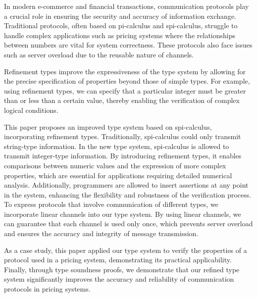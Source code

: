 \documentclass[master,english]{kuisthesis}
\date{June 12th, 2024}
\theoremstyle{definition}
\begin{document}
\maketitle					%

\begin{eabstract}				%

  In modern e-commerce and financial transactions, communication protocols play a crucial role in ensuring the security and accuracy of information exchange. Traditional protocols, often based on pi-calculus and spi-calculus, struggle to handle complex applications such as pricing systems where the relationships between numbers are vital for system correctness. These protocols also face issues such as server overload due to the reusable nature of channels.




Refinement types improve the expressiveness of the type system by allowing for the precise specification of properties beyond those of simple types. For example, using refinement types, we can specify that a particular integer must be greater than or less than a certain value, thereby enabling the verification of complex logical conditions. 

This paper proposes an improved type system based on spi-calculus, incorporating refinement types. Traditionally, spi-calculus could only transmit string-type information. In the new type system, spi-calculus is allowed to transmit integer-type information. By introducing refinement types, it enables comparisons between numeric values and the expression of more complex properties, which are essential for applications requiring detailed numerical analysis. Additionally, programmers are allowed to insert assertions at any point in the system, enhancing the flexibility and robustness of the verification process. To express protocols that involve communication of different types, we incorporate linear channels into our type system. By using linear channels, we can guarantee that each channel is used only once, which prevents server overload and ensures the accuracy and integrity of message transmission. 

As a case study, this paper applied our type system to verify the properties of a protocol used in a pricing system, demonstrating its practical applicability. Finally, through type soundness proofs, we demonstrate that our refined type system significantly improves the accuracy and reliability of communication protocols in pricing systems. 




\end{eabstract}
\end{document}
